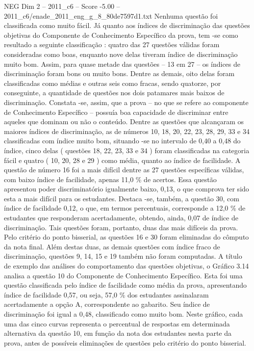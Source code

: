 \begin{textsample}{NEG Dim 2 – 2011\_c6 – Score -5.00 – 2011\_c6/enade\_2011\_eng\_g\_8\_80de7597d1.txt}
Nenhuma questão foi classificada como muito fácil.
Já quanto aos índices de discriminação das questões objetivas do Componente de Conhecimento Específico da prova, tem -se como resultado a seguinte classificação : quatro das 27 questões válidas foram consideradas como boas, enquanto nove delas tiveram índice de discriminação muito bom.
Assim, para quase metade das questões – 13 em 27 – os índices de discriminação foram bons ou muito bons.
Dentre as demais, oito delas foram classificadas como médias e outras seis como fracas, sendo quatorze, por conseguinte, a quantidade de questões nos dois patamares mais baixos de discriminação.
Constata -se, assim, que a prova – no que se refere ao componente de Conhecimento Específico – possuía boa capacidade de discriminar entre aqueles que dominam ou não o conteúdo.
Dentre as questões que alcançaram os maiores índices de discriminação, as de números 10, 18, 20, 22, 23, 28, 29, 33 e 34 classificadas com índice muito bom, situando -se no intervalo de 0,40 a 0,48 do índice, cinco delas ( questões 18, 22, 23, 33 e 34 ) foram classificadas na categoria fácil e quatro ( 10, 20, 28 e 29 ) como média, quanto ao índice de facilidade.
A questão de número 16 foi a mais difícil dentre as 27 questões específicas válidas, com baixo índice de facilidade, apenas 11,0 \% de acertos.
Essa questão apresentou poder discriminatório igualmente baixo, 0,13, o que comprova ter sido esta a mais difícil para os estudantes.
Destaca -se, também, a questão 30, com índice de facilidade 0,12, o que, em termos percentuais, corresponde a 12,0 \% de estudantes que responderam acertadamente, obtendo, ainda, 0,07 de índice de discriminação.
Tais questões foram, portanto, duas das mais difíceis da prova.
Pelo critério do ponto bisserial, as questões 16 e 30 foram eliminadas do cômputo da nota final.
Além destas duas, as demais questões com índice fraco de discriminação, questões 9, 14, 15 e 19 também não foram computadas.
A título de exemplo das análises do comportamento das questões objetivas, o Gráfico 3.14 analisa a questão 10 do Componente de Conhecimento Específico.
Esta foi uma questão classificada pelo índice de facilidade como média da prova, apresentando índice de facilidade 0,57, ou seja, 57,0 \% dos estudantes assinalaram acertadamente a opção A, correspondente ao gabarito.
Seu índice de discriminação foi igual a 0,48, classificado como muito bom.
Neste gráfico, cada uma das cinco curvas representa o percentual de respostas em determinada alternativa da questão 10, em função da nota dos estudantes nesta parte da prova, antes de possíveis eliminações de questões pelo critério do ponto bisserial.

\end{textsample}
